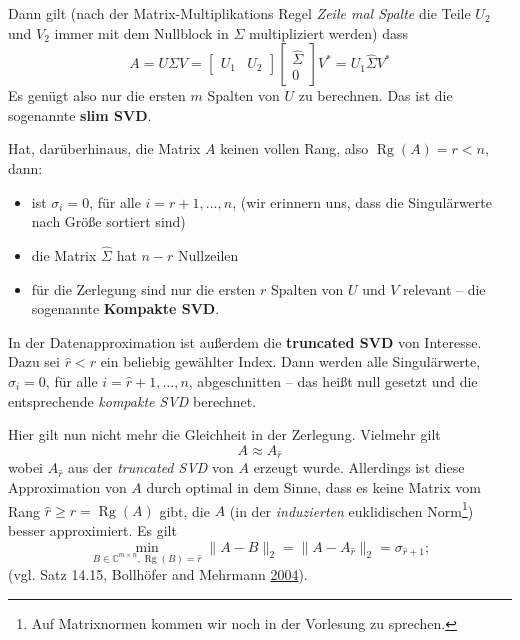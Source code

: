 \documentclass[
]{book}
\providecommand{\tightlist}{%
  \setlength{\itemsep}{0pt}\setlength{\parskip}{0pt}}
\theoremstyle{definition}
\theoremstyle{definition}
\theoremstyle{definition}
\theoremstyle{definition}
\theoremstyle{remark}
\begin{document}
Dann gilt (nach der Matrix-Multiplikations Regel \emph{Zeile mal Spalte} die Teile \(U_2\) und \(V_2\) immer mit dem Nullblock in \(\Sigma\) multipliziert werden) dass
\begin{equation*}
A = U\Sigma V = 
\begin{bmatrix}
U_1 & U_2
\end{bmatrix}
\begin{bmatrix}
\hat \Sigma \\ 0
\end{bmatrix}
V^*
=
U_1 
\hat \Sigma
V^*
\end{equation*}
Es genügt also nur die ersten \(m\) Spalten von \(U\) zu berechnen. Das ist die sogenannte \textbf{slim SVD}.

Hat, darüberhinaus, die Matrix \(A\) keinen vollen Rang, also \(\operatorname{Rg}(A) = r < n\), dann:

\begin{itemize}
\tightlist
\item
  ist \(\sigma_i=0\), für alle \(i=r+1, \dotsc, n\), (wir erinnern uns, dass die Singulärwerte nach Größe sortiert sind)
\item
  die Matrix \(\hat \Sigma\) hat \(n-r\) Nullzeilen
\item
  für die Zerlegung sind nur die ersten \(r\) Spalten von \(U\) und \(V\) relevant -- die sogenannte \textbf{Kompakte SVD}.
\end{itemize}

In der Datenapproximation ist außerdem die \textbf{truncated SVD} von Interesse. Dazu sei \(\hat r<r\) ein beliebig gewählter Index. Dann werden alle Singulärwerte, \(\sigma_i=0\), für alle \(i=\hat r+1, \dotsc, n\), abgeschnitten -- das heißt null gesetzt und die entsprechende \emph{kompakte SVD} berechnet.

Hier gilt nun nicht mehr die Gleichheit in der Zerlegung. Vielmehr gilt
\begin{equation*}
A \approx A_{\hat r}
\end{equation*}
wobei \(A_{\hat r}\) aus der \emph{truncated SVD} von \(A\) erzeugt wurde. Allerdings ist diese Approximation von \(A\) durch optimal in dem Sinne, dass es keine Matrix vom Rang \(\hat r \geq r=\operatorname{Rg}(A)\) gibt, die \(A\) (in der \emph{induzierten} euklidischen Norm\footnote{Auf Matrixnormen kommen wir noch in der Vorlesung zu sprechen.}) besser approximiert. Es gilt
\begin{equation*}
\min_{B\in \mathbb C^{m\times n}, \operatorname{Rg}(B)=\hat r} \|A-B\|_2 = \|A-A_{\hat r}\|_2 = \sigma_{\hat r + 1};
\end{equation*}
(vgl. Satz 14.15, Bollhöfer and Mehrmann \protect\hyperlink{ref-BolM04}{2004}).
\end{document}
